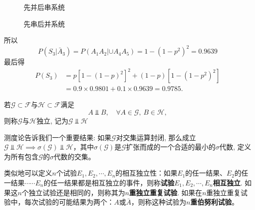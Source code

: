 \begin{solution}
\begin{figure}[!ht]
\begin{minipage}{0.48\linewidth}
            \caption{先并后串系统\label{fig1.5.1}}
        \end{minipage}
        \begin{minipage}{0.48\linewidth}
            \centering
            \caption{先串后并系统\label{fig1.5.2}}
        \end{minipage}
    \end{figure}
    所以
    \[ P(S_3|\bar A_3) = P(A_1A_2|\cup A_4A_5) = 1 - (1-p^2)^2 = 0.9639 \]
    最后得
    \begin{align*}
        P(S_3) & = p [ 1-(1-p)^2 ]^2 + (1-p)[ 1-(1-p^2)^2 ]       \\
               & = 0.9\times 0.9801 + 0.1 \times 0.9639 = 0.9785.
    \end{align*}
\end{solution}

\begin{definition}[事件域的独立性]
    若$\mathscr{G} \subset \mathscr{F}$与$\mathscr{H} \subset \mathscr{F}$满足
    \[ A \Vbar B, \quad \forall A\in\mathscr{G},\ B\in\mathscr{H}, \]
    则称$\mathscr{G}$与$\mathscr{H}$独立, 记为$\mathscr{G} \Vbar \mathscr{H}$
\end{definition}

测度论告诉我们一个重要结果: 如果$\mathscr{G}$对交集运算封闭, 那么成立$\mathscr{G}\Vbar\mathscr{H} \implies \sigma(\mathscr{G}) \Vbar \mathscr{H}$，其中$\sigma(\mathscr{G})$是$\mathscr{G}$扩张而成的一个合适的最小的$\sigma$代数, 定义为所有包含$\mathscr{G}$的$\sigma$代数的交集。

类似地可以定义$n$个试验$E_1,E_2,\cdots,E_n$的相互独立性：如果$E_1$的任一结果、$E_2$的任一结果$\cdots\cdots E_n$的任一结果都是相互独立的事件，则称\textbf{试验$E_1,E_2,\cdots,E_n$相互独立}. 如果这$n$个独立试验还是相同的，则称其为\textbf{$n$重独立重复试验}. 如果在$n$重独立重复试验中，每次试验的可能结果为两个：$A$或$\bar A$，则称这种试验为\textbf{$n$重伯努利试验}。

